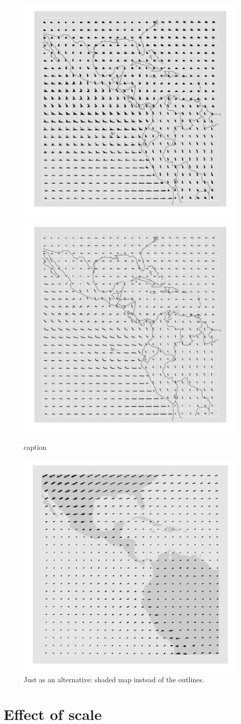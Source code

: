 \documentclass[oneside]{article}
\begin{document}
\begin{figure}[htbp]
  \centering
    \includegraphics[width=0.5\linewidth]{clouds}%
    \includegraphics[width=0.5\linewidth]{clouds-smooth}
  \caption{caption}
  \label{fig:cloud}
\end{figure}

\begin{figure}[htbp]
  \centering
    \includegraphics[width=0.5\linewidth]{clouds-heike}%
  \caption{Just as an alternative: shaded map instead of the outlines. }
  \label{fig:cloud-alt}
\end{figure}

\section{Effect of scale}
\end{document}

